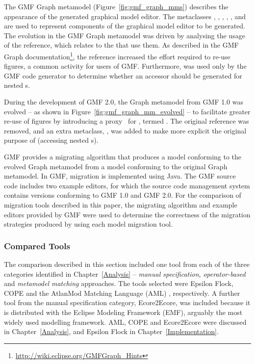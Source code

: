 The GMF Graph metamodel (Figure~\ref{fig:gmf_graph_mms}) describes the appearance of the generated graphical model editor. The metaclasses , , , , , and  are used to represent components of the graphical model editor to be generated. The evolution in the GMF Graph metamodel was driven by analysing the usage of the  reference, which relates  to the  that use them. As described in the GMF Graph documentation\footnote{\url{http://wiki.eclipse.org/GMFGraph_Hints}}, the  reference increased the effort required to re-use figures, a common activity for users of GMF. Furthermore,  was used only by the GMF code generator to determine whether an accessor
should be generated for nested s.

During the development of GMF 2.0, the Graph metamodel from GMF 1.0 was evolved -- as shown in Figure~\ref{fig:gmf_graph_mm_evolved} -- to facilitate greater re-use of figures by introducing a proxy~\cite{gamma95patterns} for , termed . The original  reference was removed, and an extra metaclass, , was added to make more explicit the original purpose of  (accessing nested s).

GMF provides a migrating algorithm that produces a model conforming to the evolved Graph metamodel from a model conforming to the original Graph metamodel. In GMF, migration is implemented using Java. The GMF source code includes two example editors, for which the source code management system contains versions conforming to GMF 1.0 and GMF 2.0. For the comparison of migration tools described in this paper, the migrating algorithm and example editors provided by GMF were used to determine the correctness of the migration strategies produced by using each model migration tool. 

\subsubsection{Compared Tools}
\label{subsec:method_tools}
The comparison described in this section included one tool from each of the three categories identified in Chapter~\ref{Analysis} -- \emph{manual specification}, \emph{operator-based} and \emph{metamodel matching} approaches. The tools selected were Epsilon Flock, COPE \cite{herrmannsdoerfer09cope} and the AtlanMod Matching Language (AML) \cite{garces09managing}, respectively. A further tool from the manual specification category, Ecore2Ecore, was included because it is distributed with the Eclipse Modeling Framework (EMF), arguably the most widely used modelling framework. AML, COPE and Ecore2Ecore were discussed in Chapter~\ref{Analysis}, and Epsilon Flock in Chapter~\ref{Implementation}.


